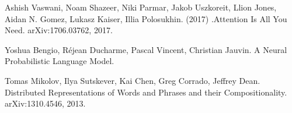 \begin{thebibliography}{9}
    Ashish Vaswani, Noam Shazeer, Niki Parmar, Jakob Uszkoreit, Llion Jones, Aidan N. Gomez, Lukasz Kaiser, Illia Polosukhin. (2017) .Attention Is All You Need. arXiv:1706.03762, 2017.

    Yoshua Bengio, Réjean Ducharme, Pascal Vincent, Christian Jauvin. A Neural Probabilistic Language Model.

    Tomas Mikolov, Ilya Sutskever, Kai Chen, Greg Corrado, Jeffrey Dean. Distributed Representations of Words and Phrases and their Compositionality. arXiv:1310.4546, 2013. 
\end{thebibliography}

